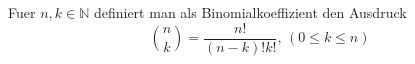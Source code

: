 Fuer $n, k \in \mathbb{N}$ definiert man als Binomialkoeffizient den Ausdruck
$$\binom{n}{k} = \frac{n!}{(n - k)! k!}, \, (0 \leq k \leq n)$$
